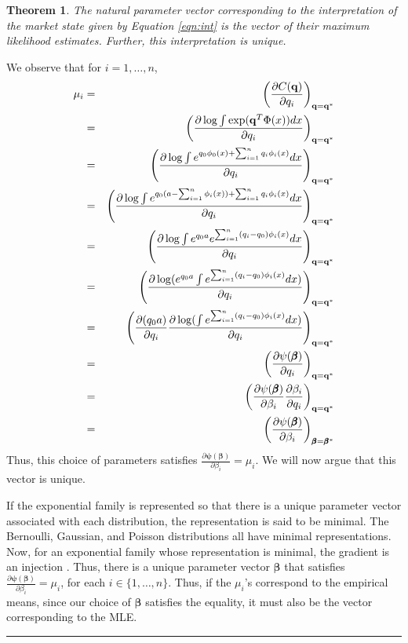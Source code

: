 \documentclass{article}
\newcommand{\betavec}{\pmb{\beta}}
\newcommand{\lpf}{\mathbf{\psi}} %
\newcommand{\qvec}{\mathbf{q}}
\newtheorem{theorem}{Theorem}
\newcommand{\qed}{\hfill\rule{7pt}{7pt}}
\newenvironment{proof}{\noindent{\bf Proof:}}{\qed\medskip}
\begin{document}
\begin{theorem}
The natural parameter vector corresponding to the interpretation of the market state given by Equation \ref{eqn:int} is the vector of their maximum likelihood estimates. Further, this interpretation is unique.
\end{theorem}
\begin{proof}
We observe that for $i=1,\ldots,n$,
\begin{eqnarray*}
\mu_{i}&=&\left(\frac{\partial C(\qvec)}{\partial q_{i}}\right)_{\qvec=\qvec^{*}}\\
&=&\left(\frac{\partial\log\int \exp(\qvec^{T}\Phi(x))dx}{\partial q_{i}}\right)_{\qvec=\qvec^{*}}\\
&=&\left(\frac{\partial\log\int e^{q_{0}\phi_{0}(x)+\sum_{i=1}^{n}q_{i}\phi_{i}(x)}dx}{\partial q_{i}}\right)_{\qvec=\qvec^{*}}\\
&=&\left(\frac{\partial\log\int e^{q_{0}(a-\sum_{i=1}^{n}\phi_{i}(x))+\sum_{i=1}^{n}q_{i}\phi_{i}(x)}dx}{\partial q_{i}}\right)_{\qvec=\qvec^{*}}\\
&=&\left(\frac{\partial\log\int e^{q_{0}a} e^{\sum_{i=1}^{n}(q_{i}-q_{0})\phi_{i}(x)}dx}{\partial q_{i}}\right)_{\qvec=\qvec^{*}}\\
&=&\left(\frac{\partial\log (e^{q_{0}a} \int e^{\sum_{i=1}^{n}(q_{i}-q_{0})\phi_{i}(x)}dx)}{\partial q_{i}}\right)_{\qvec=\qvec^{*}}\\
&=&\left(\frac{\partial (q_{0}a)}{\partial q_{i}} \frac{\partial\log (\int e^{\sum_{i=1}^{n}(q_{i}-q_{0})\phi_{i}(x)}dx)}{\partial q_{i}}\right)_{\qvec=\qvec^{*}}\\
&=&\left(\frac{\partial \lpf(\betavec)}{\partial q_{i}}\right)_{\qvec=\qvec^{*}}\\
&=&\left(\frac{\partial \lpf(\betavec)}{\partial \beta_{i}}\frac{\partial \beta_{i}}{\partial q_{i}}\right)_{\qvec=\qvec^{*}}\\
&=&\left(\frac{\partial \lpf(\betavec)}{\partial \beta_{i}}\right)_{\rm \betavec=\betavec^{*}}
\end{eqnarray*}
Thus, this choice of parameters satisfies $\frac{\partial \lpf(\betavec)}{\partial \beta_{i}}=\mu_{i}$. We will now argue that this vector is unique. 

If the exponential family is represented so that there is a unique parameter vector associated with each distribution, the representation is said to be minimal. The Bernoulli, Gaussian, and Poisson distributions all have minimal representations. Now, for an exponential family whose representation is minimal, the gradient is an injection \cite[Prop. 3.2]{WainJordan08}. Thus, there is a unique parameter vector $\betavec$ that satisfies $\frac{\partial \lpf(\betavec)}{\partial \beta_{i}}=\mu_{i}$, for each $i\in\{1,\ldots,n\}$. Thus, if the $\mu_{i}$'s correspond to the empirical means, since our choice of $\betavec$ satisfies the equality, it must also be the vector corresponding to the MLE.
\end{proof}
\end{document}
